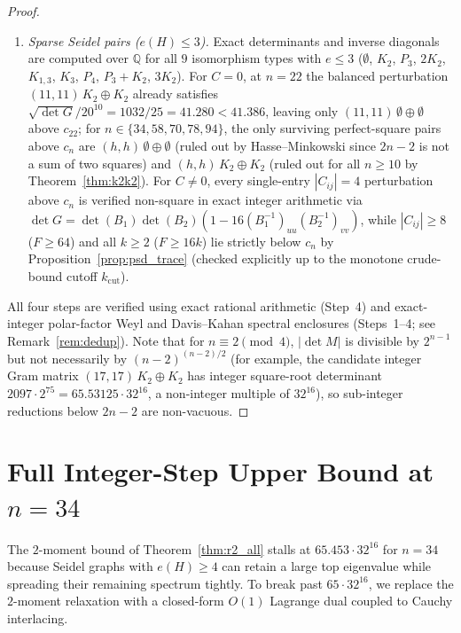 \documentclass[11pt]{article}
\theoremstyle{remark}
\newcommand{\Q}{\mathbb{Q}}
\begin{document}
\begin{proof}
\begin{enumerate}[leftmargin=*,topsep=2pt,itemsep=1pt]
\item \emph{Sparse Seidel pairs ($e(H) \le 3$).} Exact determinants and inverse diagonals are computed over $\Q$ for all $9$ isomorphism types with $e \le 3$ ($\emptyset$, $K_2$, $P_3$, $2K_2$, $K_{1,3}$, $K_3$, $P_4$, $P_3+K_2$, $3K_2$). For $C = 0$, at $n = 22$ the balanced perturbation $(11, 11)\, K_2 \oplus K_2$ already satisfies $\sqrt{\det G}/20^{10} = 1032/25 = 41.280 < 41.386$, leaving only $(11, 11)\,\emptyset \oplus \emptyset$ above $c_{22}$; for $n \in \{34, 58, 70, 78, 94\}$, the only surviving perfect-square pairs above $c_n$ are $(h, h)\,\emptyset \oplus \emptyset$ (ruled out by Hasse--Minkowski since $2n - 2$ is not a sum of two squares) and $(h, h)\, K_2 \oplus K_2$ (ruled out for all $n \ge 10$ by Theorem~\ref{thm:k2k2}). For $C \ne 0$, every single-entry $|C_{ij}| = 4$ perturbation above $c_n$ is verified non-square in exact integer arithmetic via $\det G = \det(B_1)\det(B_2)(1 - 16 (B_1^{-1})_{uu}(B_2^{-1})_{vv})$, while $|C_{ij}| \ge 8$ ($F \ge 64$) and all $k \ge 2$ ($F \ge 16k$) lie strictly below $c_n$ by Proposition~\ref{prop:psd_trace} (checked explicitly up to the monotone crude-bound cutoff $k_{\mathrm{cut}}$).
\end{enumerate}
All four steps are verified using exact rational arithmetic (Step~4) and exact-integer polar-factor Weyl and Davis--Kahan spectral enclosures (Steps~1--4; see Remark~\ref{rem:dedup}). Note that for $n \equiv 2 \pmod 4$, $|\det M|$ is divisible by $2^{n-1}$ but not necessarily by $(n - 2)^{(n-2)/2}$ (for example, the candidate integer Gram matrix $(17, 17)\, K_2 \oplus K_2$ has integer square-root determinant $2097 \cdot 2^{75} = 65.53125 \cdot 32^{16}$, a non-integer multiple of $32^{16}$), so sub-integer reductions below $2n - 2$ are non-vacuous.
\end{proof}

\section{Full Integer-Step Upper Bound at \texorpdfstring{$n = 34$}{n = 34}}\label{sec:d34}

The $2$-moment bound of Theorem~\ref{thm:r2_all} stalls at $65.453 \cdot 32^{16}$ for $n = 34$ because Seidel graphs with $e(H) \ge 4$ can retain a large top eigenvalue while spreading their remaining spectrum tightly. To break past $65 \cdot 32^{16}$, we replace the $2$-moment relaxation with a closed-form $O(1)$ Lagrange dual coupled to Cauchy interlacing.
\end{document}
